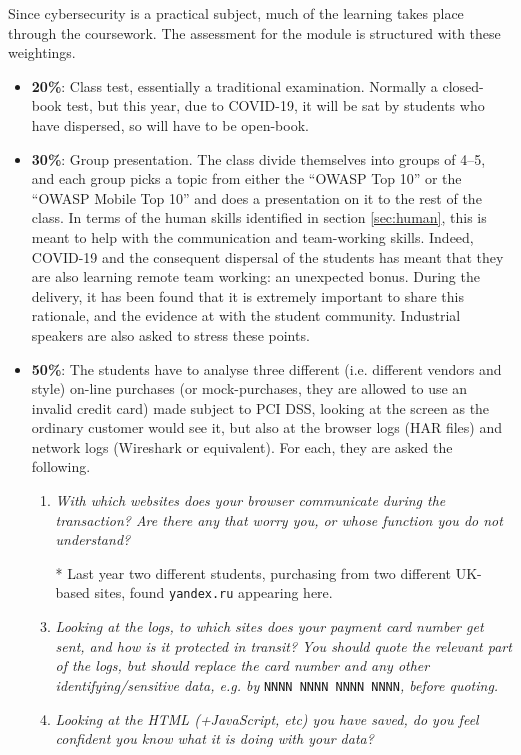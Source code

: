 \documentclass[conference]{IEEEtran}
\begin{document}
Since cybersecurity is a practical subject, much of the learning takes place through the coursework. The assessment for the module is structured with these weightings.
\begin{itemize}
\item {\textbf{20\%}}: Class test, essentially a traditional examination. Normally a closed-book test, but this year, due to COVID-19, it will be sat by students who have dispersed, so will have to be open-book.
\item {\textbf{30\%}}: Group presentation. The class divide themselves into groups of 4--5, and each group picks a topic from either the ``OWASP Top 10'' \cite{OWASP2017a} or the ``OWASP Mobile Top  10'' \cite{OWASP2016a} and does a presentation on it to the rest of the class.  In terms of the human skills identified in section \ref{sec:human}, this is meant to help with the communication and team-working skills. Indeed, COVID-19 and the consequent dispersal of the students has meant that they are also learning remote team working: an unexpected bonus.  During the delivery, it has been found that it is extremely important to share this rationale, and the evidence at \cite{WallStreetJournal2018c,InfoSec2019a,Beaver2019c} with the student community.  Industrial speakers are also asked to stress these points.
\item {\textbf{50\%}}: The students have to analyse three different (i.e. different vendors and style) on-line purchases (or mock-purchases, they are allowed to use an invalid  credit card) made subject to PCI DSS, looking at the screen as the ordinary customer would see it, but also at the browser logs (HAR files) and network logs (Wireshark or equivalent). For each, they are asked the following.
\begin{enumerate}
\item \emph{With which websites does your browser communicate during the transaction? Are there any that worry you, or whose function you do not understand?}
\item[*]Last year two different students, purchasing from two different UK-based sites, found \verb+yandex.ru+ appearing here.
\item \emph{Looking at the logs, to which sites does your payment card number get sent, and how is it protected in transit? You \emph{should} quote the relevant part of the logs, but \emph{should} replace the card number and any other identifying/sensitive data, e.g. by} \verb+NNNN NNNN NNNN NNNN+\emph{, before quoting.}
\item \emph{Looking at the HTML (+JavaScript, etc) you have saved, do you feel confident you know what it is doing with your data?}

\end{enumerate}
\end{itemize}
\end{document}

